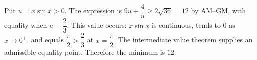 Put $u=x\sin x>0$. The expression is $9u+\dfrac{4}{u}\ge2\sqrt{36}=12$ by AM--GM, with equality when $u=\dfrac{2}{3}$. This value occurs: $x\sin x$ is continuous, tends to 0 as $x\to0^+$, and equals $\dfrac{\pi}{2}>\dfrac{2}{3}$ at $x=\dfrac{\pi}{2}$. The intermediate value theorem supplies an admissible equality point. Therefore the minimum is $\boxed{12}$.
